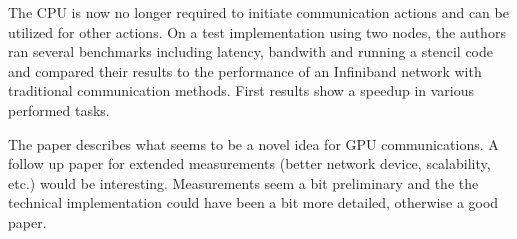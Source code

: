 \documentclass[a4paper,11pt]{scrartcl}
\begin{document}
The CPU is now no longer required to initiate communication actions and can be utilized for other actions. On a test implementation using two nodes, the authors ran several benchmarks including latency, bandwith and running a stencil code and compared their results to the performance of an Infiniband network with traditional communication methods. First results show a speedup in various performed tasks.

The paper describes what seems to be a novel idea for GPU communications. A follow up paper for extended measurements (better network device, scalability, etc.) would be interesting. Measurements seem a bit preliminary and the the technical implementation could have been a bit more detailed, otherwise a good paper.
\end{document}
